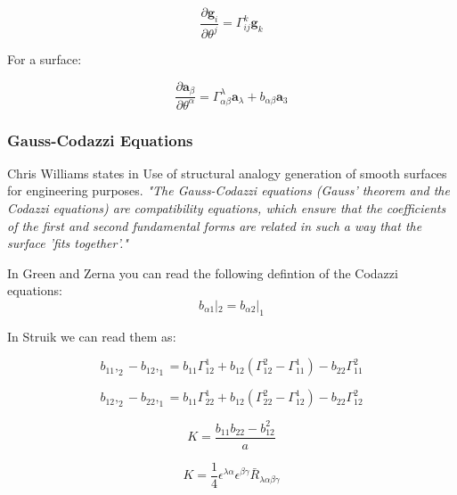 \begin{equation}
 \frac{\partial\textbf{g}_i}{\partial\theta^j} = \Gamma^k_{i j} \textbf{g}_k 
\end{equation}

For a surface:

\begin{equation}
    \frac{\partial\textbf{a}_\beta}{\partial\theta^\alpha} = \Gamma^\lambda_{\alpha \beta} \textbf{a}_\lambda + b_{\alpha \beta}\textbf{a}_3
\end{equation}



\subsubsection{Gauss-Codazzi Equations}

Chris Williams states in Use of structural analogy
generation of smooth
surfaces for engineering
purposes. \textit{ "The Gauss-Codazzi equations (Gauss' theorem and the
Codazzi equations) are compatibility equations, which
ensure that the coefficients of the first and second fundamental
forms are related in such a way that the surface
'fits together'."} 




In Green and Zerna you can read the following defintion of the Codazzi
equations:
\begin{equation}
    b_{\alpha 1}|_2 = b_{\alpha 2}|_1 
\end{equation}

In Struik we can read them as:

\begin{equation}
   b_{11},_2 - b_{12},_1 = b_{11} \Gamma^1_{12} + b_{12}(\Gamma^2_{12} - \Gamma^1_{11}) - b_{22}\Gamma^2_{11} 
\end{equation}

\begin{equation}
   b_{12},_2 - b_{22},_1 = b_{11} \Gamma^1_{22} + b_{12}(\Gamma^2_{22} - \Gamma^1_{12}) - b_{22}\Gamma^2_{12} 
\end{equation}


\begin{equation}\label{Gauss}
  K= \frac{b_{11}b_{22}-b^2_{12}}{a}
\end{equation}

\begin{equation}
  K= \frac{1}{4}\epsilon^{\lambda \alpha} \epsilon^{\beta \gamma} \bar{R}_{\lambda \alpha \beta \gamma}
\end{equation}

